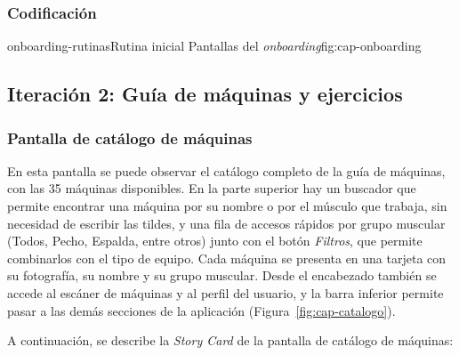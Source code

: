 \subsubsection{Codificación}

  {onboarding-rutinas}{Rutina inicial}
  {Pantallas del \emph{onboarding}}{fig:cap-onboarding}

\subsection{Iteración 2: Guía de máquinas y ejercicios}
\label{subsec:it2}

\subsubsection{Pantalla de catálogo de máquinas}

En esta pantalla se puede observar el catálogo completo de la guía de máquinas,
con las 35 máquinas disponibles. En la parte superior hay un buscador que
permite encontrar una máquina por su nombre o por el músculo que trabaja, sin
necesidad de escribir las tildes, y una fila de accesos rápidos por grupo
muscular (Todos, Pecho, Espalda, entre otros) junto con el botón
\emph{Filtros}, que permite combinarlos con el tipo de equipo. Cada máquina se
presenta en una tarjeta con su fotografía, su nombre y su grupo muscular.
Desde el encabezado también se accede al escáner de máquinas y al perfil del
usuario, y la barra inferior permite pasar a las demás secciones de la
aplicación (Figura~\ref{fig:cap-catalogo}).


A continuación, se describe la \emph{Story Card} de la pantalla de catálogo de máquinas:

